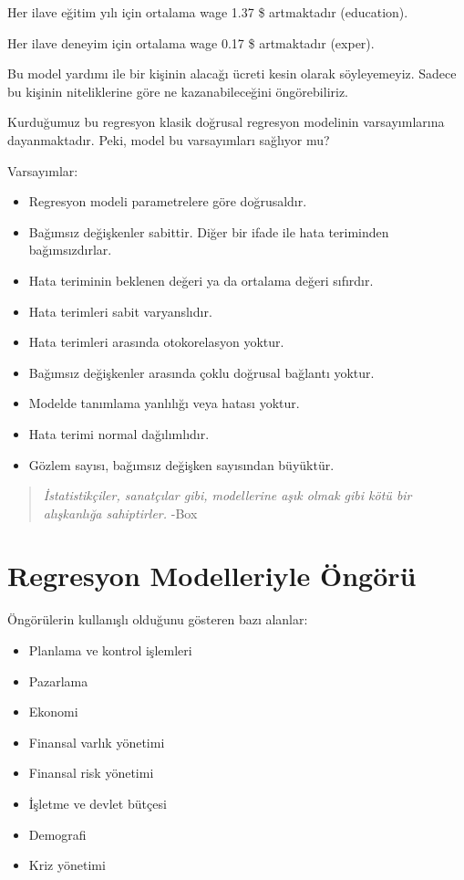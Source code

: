 \documentclass[
]{book}
\begin{document}
Her ilave eğitim yılı için ortalama wage 1.37 \$ artmaktadır (education).

Her ilave deneyim için ortalama wage 0.17 \$ artmaktadır (exper).

Bu model yardımı ile bir kişinin alacağı ücreti kesin olarak söyleyemeyiz. Sadece bu kişinin niteliklerine göre ne kazanabileceğini öngörebiliriz.

Kurduğumuz bu regresyon klasik doğrusal regresyon modelinin varsayımlarına dayanmaktadır. Peki, model bu varsayımları sağlıyor mu?

Varsayımlar:

\begin{itemize}
\item
  Regresyon modeli parametrelere göre doğrusaldır.
\item
  Bağımsız değişkenler sabittir. Diğer bir ifade ile hata teriminden bağımsızdırlar.
\item
  Hata teriminin beklenen değeri ya da ortalama değeri sıfırdır.
\item
  Hata terimleri sabit varyanslıdır.
\item
  Hata terimleri arasında otokorelasyon yoktur.
\item
  Bağımsız değişkenler arasında çoklu doğrusal bağlantı yoktur.
\item
  Modelde tanımlama yanlılığı veya hatası yoktur.
\item
  Hata terimi normal dağılımlıdır.
\item
  Gözlem sayısı, bağımsız değişken sayısından büyüktür.
\end{itemize}

\begin{quote}
\emph{İstatistikçiler, sanatçılar gibi, modellerine aşık olmak gibi kötü bir alışkanlığa sahiptirler.} -Box
\end{quote}

\hypertarget{regresyon-modelleriyle-uxf6nguxf6ruxfc}{%
\chapter{Regresyon Modelleriyle Öngörü}\label{regresyon-modelleriyle-uxf6nguxf6ruxfc}}

Öngörülerin kullanışlı olduğunu gösteren bazı alanlar:

\begin{itemize}
\item
  Planlama ve kontrol işlemleri
\item
  Pazarlama
\item
  Ekonomi
\item
  Finansal varlık yönetimi
\item
  Finansal risk yönetimi
\item
  İşletme ve devlet bütçesi
\item
  Demografi
\item
  Kriz yönetimi
\end{itemize}
\end{document}
